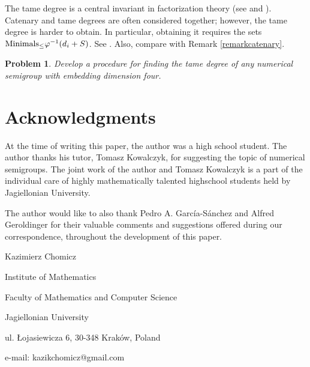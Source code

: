 \documentclass[12pt]{article}
\newtheorem{prob}[thm]{Problem}
\theoremstyle{remark}
\begin{document}
The tame degree is a central invariant in factorization theory (see \cite[Chapter 6]{AssiDAnnaGarciaSanchez2020} and \cite{Geroldinger2025}). Catenary and tame degrees are often considered together; however, the tame degree is harder to obtain. In particular, obtaining it requires the sets $\textup{Minimals}_{\leq} \varphi^{-1}(d_i + S)$. See \cite[Theorem 16]{AssiDAnnaGarciaSanchez2020}. Also, compare \cite[Proposition 70]{AssiDAnnaGarciaSanchez2020} with Remark \ref{remarkcatenary}.

\begin{prob}\label{problemtame}
    Develop a procedure for finding the tame degree of any numerical semigroup with embedding dimension four. 
\end{prob}
 




\section{Acknowledgments}
At the time of writing this paper, the author was a high school student. The author thanks his tutor, Tomasz Kowalczyk, for suggesting the topic of numerical semigroups. The joint work of the author and Tomasz Kowalczyk is a part of the individual care of highly mathematically talented highschool students held by Jagiellonian University. 

The author would like to also thank Pedro A. Garc{\'i}a{-}S{\'a}nchez and Alfred Geroldinger for their valuable comments and suggestions offered during our correspondence, throughout the development of this paper.







\vspace{5pt}

\noindent



\vspace{10pt}

\begin{small}





\noindent
Kazimierz Chomicz

\noindent
Institute of Mathematics

\noindent
Faculty of Mathematics and Computer Science

\noindent
Jagiellonian University

\noindent
ul. Łojasiewicza 6, 30-348 Kraków, Poland

\noindent
e-mail: kazikchomicz@gmail.com



\end{small}	










  
\end{document}
